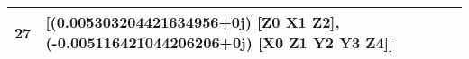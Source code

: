 \begin{tabular}{rl}
      27 &                                                                                                                                                                                                                                                                                      [(0.005303204421634956+0j) [Z0 X1 Z2], (-0.005116421044206206+0j) [X0 Z1 Y2 Y3 Z4]] \\
\bottomrule
\end{tabular}
